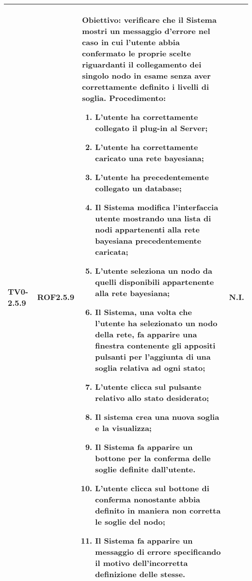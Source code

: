 \begin{longtable}{|C{.15\textwidth}|C{.13\textwidth}|m{.52\textwidth}|C{.08\textwidth}|}
TV0-2.5.9 & ROF2.5.9 &
	\textbf{Obiettivo}: verificare che il Sistema mostri un messaggio d'errore nel caso in cui l'utente abbia confermato le proprie scelte riguardanti il collegamento dei singolo nodo in esame senza aver correttamente definito i livelli di soglia. \newline
	\textbf{Procedimento}:
	\begin{enumerate}
		\item L'utente ha correttamente collegato il plug-in al Server;
		\item L'utente ha correttamente caricato una rete bayesiana;
		\item L'utente ha precedentemente collegato un database;
		\item Il Sistema modifica l'interfaccia utente mostrando una lista di nodi appartenenti alla rete bayesiana precedentemente caricata;
		\item L'utente seleziona un nodo da quelli disponibili appartenente alla rete bayesiana;
		\item Il Sistema, una volta che l'utente ha selezionato un nodo della rete, fa apparire una finestra contenente gli appositi pulsanti per l'aggiunta di una soglia relativa ad ogni stato;
		\item L'utente clicca sul pulsante relativo allo stato desiderato;
		\item Il sistema crea una nuova soglia e la visualizza;
		\item Il Sistema fa apparire un bottone per la conferma delle soglie definite dall'utente.
		\item L'utente clicca sul bottone di conferma nonostante abbia definito in maniera non corretta le soglie del nodo;
		\item Il Sistema fa apparire un messaggio di errore specificando il motivo dell'incorretta definizione delle stesse.
	\end{enumerate}
	& N.I. \\
\hline


\end{longtable}

